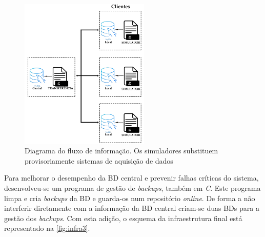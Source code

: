 \documentclass[11pt,twoside,a4paper]{report}
\begin{document}
\begin{figure}[H]
	\begin{center}
		\includegraphics[width=0.55\textwidth]{Esquema_Projeto_5} %
		\caption[Diagrama do fluxo de informação]{Diagrama do fluxo de informação. Os simuladores substituem provisoriamente sistemas de aquisição de dados}
		\label{fig:infra2}
		\end{center}
\end{figure}
Para melhorar o desempenho da BD central e prevenir falhas críticas do sistema, desenvolveu-se um programa de gestão de \textit{backups}, também em \textit{C}. Este programa limpa e cria \textit{backups} da BD e guarda-os num repositório \textit{online}. De forma a não interferir diretamente com a informação da BD central criam-se duas BDs para a gestão dos \textit{backups}. Com esta adição, o esquema da infraestrutura final está representado na \autoref{fig:infra3}.\par 
\end{document}
